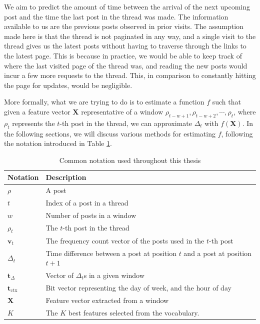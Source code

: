 \newcommand{\vocab}{\mathbf{v}}
\newcommand{\dtvec}{\mathbf{t}_\Delta}
\newcommand{\ctxvec}{\mathbf{t}_\text{ctx}}
\newcommand{\dt}{\Delta_t}
\newcommand{\prerror}{Pr_{error}}
\newcommand{\weights}{\mathbf{w}}
\newcommand{\X}{\mathbf{X}}
\newcommand{\post}{\rho}
\renewcommand{\t}{t}
\newcommand{\w}{w}


We aim to predict the amount of time between the arrival of the next upcoming post and 
the time the last post in the thread was made. The information available to us 
are the previous posts observed in prior visits.  
The assumption made here is that the thread is not paginated in any way, and a 
single visit to the thread gives us the latest posts without having to traverse 
through the links to the latest page. This is because in practice, we would be 
able to keep track of where the last visited page of the thread was, and reading 
the new posts would incur a few more requests to the thread. This, in comparison 
to constantly hitting the page for updates, would be negligible.

More formally, what we are trying to do is to estimate a function $f$ such that 
given a feature vector $\X$ representative of a window $\post_{t - w + 
1},\post_{t - w + 2},\cdots ,\post_t$, where $\post_t$ represents the $t$-th 
post in the thread, we can approximate $\dt$ with $f(\X)$.  In the following 
sections, we will discuss various methods for estimating $f$, following the notation introduced in Table \ref{table:notations}.

\begin{table}
	\begin{center}
	\begin{tabular}{l l}
	\hline
Notation	&	Description\\
	\hline
$\post$		&	A post\\
$\t$		&	Index of a post in a thread\\
$\w$		&	Number of posts in a window  \\
$\post_\t$	&	The $t$-th post in the thread\\
$\vocab_\t$	&	The frequency count vector of the posts used in the $t$-th 
	post\\
$\dt$		&	Time difference between a post at position $\t$ and a post at 
	position $\t+1$ \\
$\dtvec$	&	Vector of $\dt$s in a given window\\
$\ctxvec$	&	Bit vector representing the day of week, and the hour of day\\
$\X$		&	Feature vector extracted from a window\\
$K$			&	The $K$ best features selected from the vocabulary.\\
	\hline
	\end{tabular}
\end{center}
\caption{Common notation used throughout this thesis} \label{table:notations}
\end{table}

